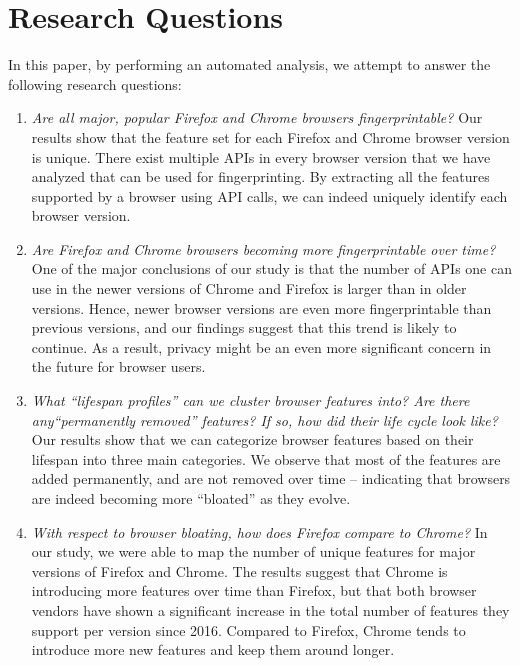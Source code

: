 \section{Research Questions}
\label{sec:introduction}

In this paper, by performing an automated analysis, we attempt to
answer the following research questions:

\begin{enumerate}
  
\item {\em Are all major, popular Firefox and Chrome browsers
    fingerprintable?} Our results show that the feature set for each
  Firefox and Chrome browser version is unique. There exist multiple
  APIs in every browser version that we have analyzed that can be used
  for fingerprinting. By extracting all the features supported by a
  browser using API calls, we can indeed uniquely identify each
  browser version.

\item {\em Are Firefox and Chrome browsers becoming more
    fingerprintable over time?} One of the major conclusions of our
  study is that the number of APIs one can use in the newer versions
  of Chrome and Firefox is larger than in older versions. Hence, newer
  browser versions are even more fingerprintable than previous
  versions, and our findings suggest that this trend is likely to
  continue. As a result, privacy might be an even more significant
  concern in the future for browser users.
    
\item {\em What ``lifespan profiles'' can we cluster browser features
    into? Are there any``permanently removed'' features? If so, how
    did their life cycle look like?} Our results show that we can
  categorize browser features based on their lifespan into three main
  categories. We observe that most of the features are added
  permanently, and are not removed over time -- indicating that
  browsers are indeed becoming more ``bloated'' as they evolve.

\item {\em With respect to browser bloating, how does Firefox compare
    to Chrome?} In our study, we were able to map the number of unique
  features for major versions of Firefox and Chrome. The results
  suggest that Chrome is introducing more features over time than
  Firefox, but that both browser vendors have shown a significant
  increase in the total number of features they support per version
  since 2016. Compared to Firefox, Chrome tends to introduce more new
  features and keep them around longer.
 

\end{enumerate}
